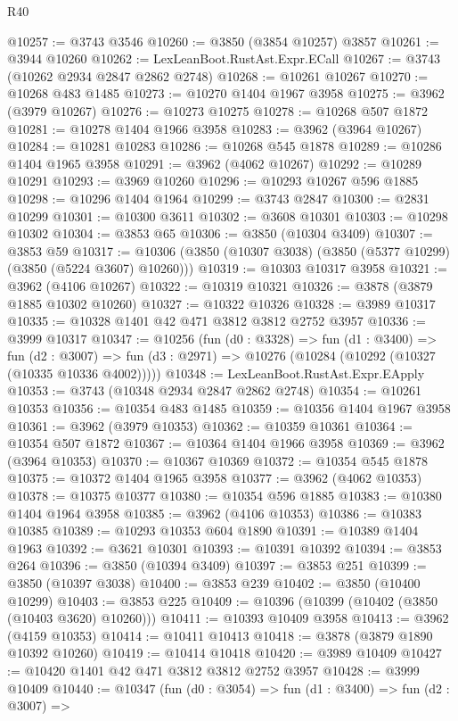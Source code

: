 \begin{lexlean}{R40}
\begin{coremodule}
@10257 := @3743 @3546
@10260 := @3850 (@3854 @10257) @3857
@10261 := @3944 @10260
@10262 := LexLeanBoot.RustAst.Expr.ECall
@10267 := @3743 (@10262 @2934 @2847 @2862 @2748)
@10268 := @10261 @10267
@10270 := @10268 @483 @1485
@10273 := @10270 @1404 @1967 @3958
@10275 := @3962 (@3979 @10267)
@10276 := @10273 @10275
@10278 := @10268 @507 @1872
@10281 := @10278 @1404 @1966 @3958
@10283 := @3962 (@3964 @10267)
@10284 := @10281 @10283
@10286 := @10268 @545 @1878
@10289 := @10286 @1404 @1965 @3958
@10291 := @3962 (@4062 @10267)
@10292 := @10289 @10291
@10293 := @3969 @10260
@10296 := @10293 @10267 @596 @1885
@10298 := @10296 @1404 @1964
@10299 := @3743 @2847
@10300 := @2831 @10299
@10301 := @10300 @3611
@10302 := @3608 @10301
@10303 := @10298 @10302
@10304 := @3853 @65
@10306 := @3850 (@10304 @3409)
@10307 := @3853 @59
@10317 := @10306 (@3850 (@10307 @3038) (@3850 (@5377 @10299) (@3850 (@5224 @3607) @10260)))
@10319 := @10303 @10317 @3958
@10321 := @3962 (@4106 @10267)
@10322 := @10319 @10321
@10326 := @3878 (@3879 @1885 @10302 @10260)
@10327 := @10322 @10326
@10328 := @3989 @10317
@10335 := @10328 @1401 @42 @471 @3812 @3812 @2752 @3957
@10336 := @3999 @10317
@10347 := @10256
    (fun (d0 : @3328) =>
    fun (d1 : @3400) =>
    fun (d2 : @3007) => fun (d3 : @2971) => @10276 (@10284 (@10292 (@10327 (@10335 @10336 @4002)))))
@10348 := LexLeanBoot.RustAst.Expr.EApply
@10353 := @3743 (@10348 @2934 @2847 @2862 @2748)
@10354 := @10261 @10353
@10356 := @10354 @483 @1485
@10359 := @10356 @1404 @1967 @3958
@10361 := @3962 (@3979 @10353)
@10362 := @10359 @10361
@10364 := @10354 @507 @1872
@10367 := @10364 @1404 @1966 @3958
@10369 := @3962 (@3964 @10353)
@10370 := @10367 @10369
@10372 := @10354 @545 @1878
@10375 := @10372 @1404 @1965 @3958
@10377 := @3962 (@4062 @10353)
@10378 := @10375 @10377
@10380 := @10354 @596 @1885
@10383 := @10380 @1404 @1964 @3958
@10385 := @3962 (@4106 @10353)
@10386 := @10383 @10385
@10389 := @10293 @10353 @604 @1890
@10391 := @10389 @1404 @1963
@10392 := @3621 @10301
@10393 := @10391 @10392
@10394 := @3853 @264
@10396 := @3850 (@10394 @3409)
@10397 := @3853 @251
@10399 := @3850 (@10397 @3038)
@10400 := @3853 @239
@10402 := @3850 (@10400 @10299)
@10403 := @3853 @225
@10409 := @10396 (@10399 (@10402 (@3850 (@10403 @3620) @10260)))
@10411 := @10393 @10409 @3958
@10413 := @3962 (@4159 @10353)
@10414 := @10411 @10413
@10418 := @3878 (@3879 @1890 @10392 @10260)
@10419 := @10414 @10418
@10420 := @3989 @10409
@10427 := @10420 @1401 @42 @471 @3812 @3812 @2752 @3957
@10428 := @3999 @10409
@10440 := @10347
    (fun (d0 : @3054) =>
    fun (d1 : @3400) =>
    fun (d2 : @3007) =>

\end{coremodule}
\end{lexlean}
